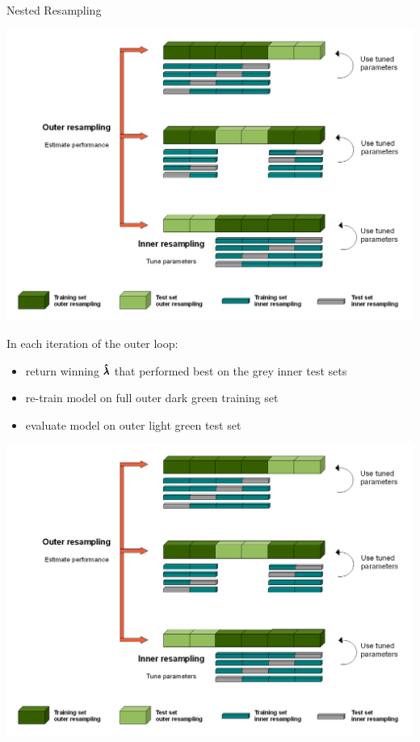 \begin{frame}[c,allowframebreaks]{Nested Resampling}
    \begin{center}
        \includegraphics[height=0.55\textheight]{images/Nested_Resampling}
    \end{center}

    \framebreak

    \begin{footnotesize}
    In each iteration of the outer loop:
    \begin{itemize}
    \item return winning $\pmb{\hat{\lambda}}$ that performed best on the grey inner test sets
    \item re-train model on full outer dark green training set
    \item evaluate model on outer light green test set
    \end{itemize}
    \end{footnotesize}

    \begin{center}
        \includegraphics[height=0.55\textheight]{images/Nested_Resampling}
    \end{center}


\end{frame}
